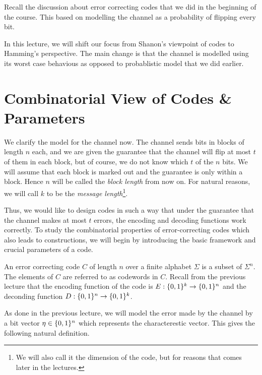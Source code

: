 %
%

Recall the discussion about error correcting codes that we did in the beginning of the course. This based on modelling the channel as a probability of flipping every bit.

In this lecture, we will shift our focus from Shanon's viewpoint of codes to Hamming's perspective. The main change is that the channel is modelled using its worst case behavious as opposed to probablistic model that we did earlier. 

\section{Combinatorial View of Codes \& Parameters}
We clarify the model for the channel now. The channel sends bits in blocks of length $n$ each, and we are given the guarantee that the channel will flip at most $t$ of them in each block, but of course, we do not know which $t$ of the $n$ bits. We will assume that each block is marked out and the guarantee is only within a block. Hence $n$ will be called the {\em block length} from now on. For natural reasons, we will call $k$ to be the \textit{message length}\footnote{We will also call it the dimension of the code, but for reasons that comes later in the lectures.}.

Thus, we would like to design codes in such a way that under the guarantee that the channel makes at most $t$ errors, the encoding and decoding functions work correctly. To study the combinatorial properties of error-correcting codes which also leads to constructions, we will begin by introducing the basic framework and crucial parameters of a code. 

\begin{definition}
An error correcting code $C$ of length $n$ over a finite alphabet $\Sigma$ is a subset of $\Sigma^n$. The elements of $C$ are referred to as codewords in $C$. Recall from the previous lecture that the encoding function of the code is $E : \{0,1\}^k \to \{0,1\}^n$ and the deconding function $D: \{0,1\}^n \to \{0,1\}^k$. \end{definition}

As done in the previous lecture, we will model the error made by the channel by a bit vector $\eta \in \{0,1\}^n$ which represents the characterestic vector. This gives the following natural definition.

